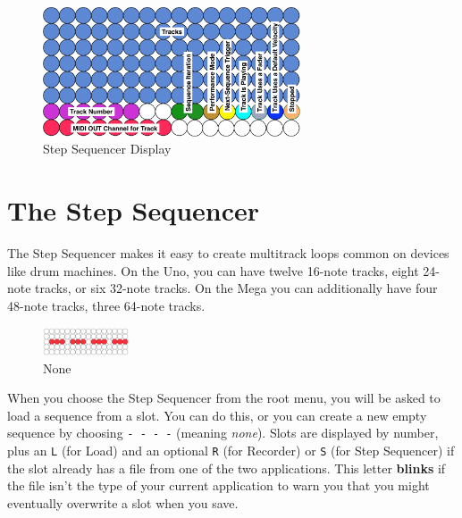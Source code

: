 \documentclass{article}
\begin{document}
\clearpage


\begin{figure}
\vspace{-1.5em}\includegraphics[width=3in]{stepsequencer}
\vspace{-2em}\caption{\small Step Sequencer Display}\vspace{-1em}
\label{stepsequencer}
\end{figure}



\section {The Step Sequencer}
\label{stepsequencersec}

The Step Sequencer makes it easy to create multitrack loops common on devices like drum machines.  On the Uno, you can have twelve 16-note tracks, eight 24-note tracks, or six 32-note tracks.  On the Mega you can additionally have four 48-note tracks, three 64-note tracks.

\begin{figure}
\vspace{-1em}\includegraphics[width=1in]{none.pdf}
\vspace{-2em}\caption{\small None}\vspace{-1em}
\label{none}
\end{figure}

When you choose the Step Sequencer from the root menu, you will be asked to load a sequence from a slot.  You can do this, or you can create a new empty sequence by choosing \texttt{-~-~-~-} (meaning {\it none}).  Slots are displayed by number, plus an \texttt{L} (for Load) and an optional \texttt{R} (for Recorder) or \texttt{S} (for Step Sequencer) if the slot already has a file from one of the two applications.  This letter {\bf blinks} if the file isn't the type of your current application to warn you that you might eventually overwrite a slot when you save.
\end{document}
